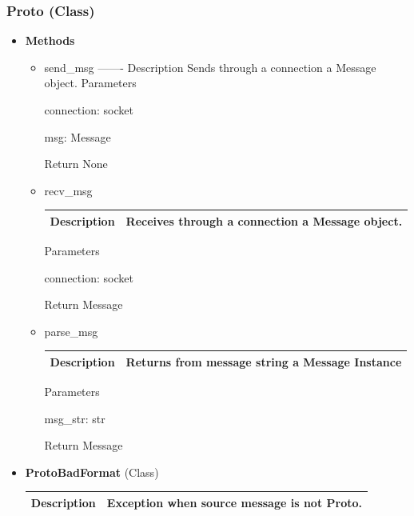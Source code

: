 \documentclass[11pt]{article}
\begin{document}
\subsubsection{Proto (Class)}\label{proto-class}

\begin{itemize}
\item
  \textbf{Methods}

  \begin{itemize}
  \item
    send\_msg \textbar{} \textbar{} \textbar{}
    \textbar---\textbar----\textbar{} \textbar{} Description \textbar{}
    Sends through a connection a Message object. \textbar{}
    \textbar Parameters\textbar{}

    connection: socket

    msg: Message

    \textbar Return \textbar{} None \textbar{}
  \item
    recv\_msg

    \begin{longtable}[]{@{}ll@{}}
    \toprule
    \endhead
    Description & Receives through a connection a Message
    object.\tabularnewline
    \bottomrule
    \end{longtable}

    \textbar Parameters\textbar{}

    connection: socket

    \textbar Return \textbar{} Message \textbar{}
  \item
    parse\_msg

    \begin{longtable}[]{@{}ll@{}}
    \toprule
    \endhead
    Description & Returns from message string a Message
    Instance\tabularnewline
    \bottomrule
    \end{longtable}

    \textbar Parameters\textbar{}

    msg\_str: str

    \textbar Return \textbar{} Message \textbar{}
  \end{itemize}
\item
  \textbf{ProtoBadFormat} (Class)

  \begin{longtable}[]{@{}ll@{}}
  \toprule
  \endhead
  Description & Exception when source message is not
  Proto.\tabularnewline
  \bottomrule
  \end{longtable}
\end{itemize}
\end{document}
